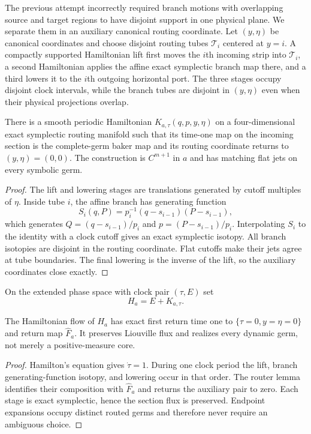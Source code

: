 The previous attempt incorrectly required branch motions with overlapping
source and target regions to have disjoint support in one physical plane.  We
separate them in an auxiliary canonical routing coordinate.  Let
$(y,\eta)$ be canonical coordinates and choose disjoint routing tubes
$\mathcal T_i$ centered at $y=i$.  A compactly supported Hamiltonian lift first
moves the $i$th incoming strip into $\mathcal T_i$, a second Hamiltonian applies
the affine exact symplectic branch map there, and a third lowers it to the
$i$th outgoing horizontal port.  The three stages occupy disjoint clock
intervals, while the branch tubes are disjoint in $(y,\eta)$ even when their
physical projections overlap.

\begin{lemma}
\label{lem:r8-a1-router}
There is a smooth periodic Hamiltonian
$K_{a,\tau}(q,p,y,\eta)$ on a four-dimensional exact symplectic routing manifold
such that its time-one map on the incoming section is the complete-germ baker
map and its routing coordinate returns to $(y,\eta)=(0,0)$.  The construction
is $C^{m+1}$ in $a$ and has matching flat jets on every symbolic germ.
\end{lemma}

\begin{proof}
The lift and lowering stages are translations generated by cutoff multiples of
$\eta$.  Inside tube $i$, the affine branch has generating function
\[
 S_i(q,P)=p_i^{-1}(q-s_{i-1})(P-s_{i-1}),
\]
which generates $Q=(q-s_{i-1})/p_i$ and
$p=(P-s_{i-1})/p_i$.  Interpolating $S_i$ to the identity with a clock cutoff
gives an exact symplectic isotopy.  All branch isotopies are disjoint in the
routing coordinate.  Flat cutoffs make their jets agree at tube boundaries.
The final lowering is the inverse of the lift, so the auxiliary coordinates
close exactly.
\end{proof}

On the extended phase space with clock pair $(\tau,E)$ set
\[
 H_a=E+K_{a,\tau}.
\]

\begin{theorem}
\label{thm:r8-a1-suspension}
The Hamiltonian flow of $H_a$ has exact first return time one to
$\{\tau=0,y=\eta=0\}$ and return map $\widehat F_a$.  It preserves Liouville
flux and realizes every dynamic germ, not merely a positive-measure core.
\end{theorem}

\begin{proof}
Hamilton's equation gives $\dot\tau=1$.  During one clock period the lift,
branch generating-function isotopy, and lowering occur in that order.  The
router lemma identifies their composition with $\widehat F_a$ and returns the
auxiliary pair to zero.  Each stage is exact symplectic, hence the section flux
is preserved.  Endpoint expansions occupy distinct routed germs and therefore
never require an ambiguous choice.
\end{proof}

